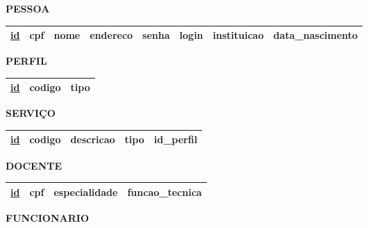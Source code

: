 \documentclass{article}
\begin{document}
\noindent
\textbf{PESSOA}
\vspace{-5pt}

\begin{table}[H]
  \renewcommand{\arraystretch}{1.5}
  \begin{tabular}{|c|c|c|c|c|c|c|c|}
    \hline
    \underline{id} &
    cpf &
    nome & 
    endereco &
    senha &
    login &
    instituicao &
    data\_nascimento \\
    \hline
  \end{tabular}
\end{table}

\noindent
\textbf{PERFIL}
\vspace{-5pt}

\begin{table}[H]
  \renewcommand{\arraystretch}{1.5}
  \begin{tabular}{|c|c|c|}
    \hline
    
    \underline{id} &
    codigo &
    tipo  \\
    \hline
  \end{tabular}
\end{table}

\noindent
\textbf{SERVIÇO}
\vspace{-5pt}

\begin{table}[H]
  \renewcommand{\arraystretch}{1.5}
  \begin{tabular}{|c|c|c|c|c|}
    \hline
    \underline{id} &
    codigo &
    descricao &
    tipo &
    id\_perfil \\
    \hline
  \end{tabular}
\end{table}

\noindent
\textbf{DOCENTE}
\vspace{-5pt}

\begin{table}[H]
  \renewcommand{\arraystretch}{1.5}
  \begin{tabular}{|c|c|c|c|}
    \hline
    \underline{id} &
    cpf &
    especialidade &
    funcao\_tecnica \\
    \hline
  \end{tabular}
\end{table}

\noindent
\textbf{FUNCIONARIO}
\vspace{-5pt}
\end{document}
